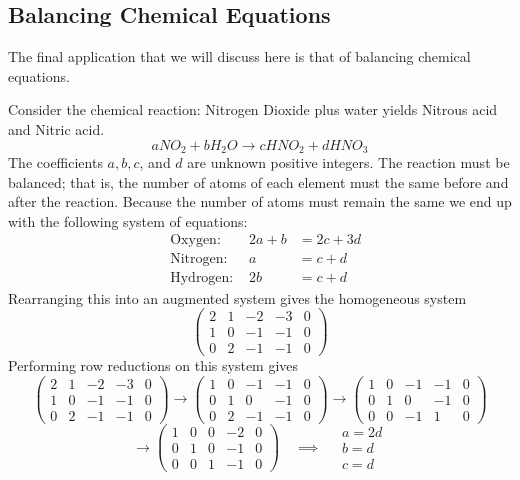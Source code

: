 \subsection{Balancing Chemical Equations}
The final application that we will discuss here is that of balancing chemical equations.  

Consider the chemical reaction: Nitrogen Dioxide plus water yields Nitrous acid and Nitric
acid.
\[ aNO_2 + b H_2O \to c HNO_2 + d HNO_3 \]
The coefficients $a,b,c$, and $d$ are unknown positive integers.  The reaction must be
balanced; that is, the number of atoms of each element must the same before and after the
reaction.  Because the number of atoms must remain the same we end up with the following
system of equations:
\begin{align*}
    &\text{Oxygen: } &  2a + b &= 2c + 3d \\
    &\text{Nitrogen: }  & a &= c + d \\
    &\text{Hydrogen: }  & 2b &= c + d
\end{align*}
Rearranging this into an augmented system gives the homogeneous system
\[ \left( \begin{array}{cccc|c} 2 & 1 & -2 & -3 & 0 \\
                                1 & 0 & -1 & -1 & 0 \\
                                0 & 2 & -1 & -1 & 0 \end{array} \right) \]
Performing row reductions on this system gives
\[ \left( \begin{array}{cccc|c} 2 & 1 & -2 & -3 & 0 \\
                                1 & 0 & -1 & -1 & 0 \\
                                0 & 2 & -1 & -1 & 0 \end{array} \right) 
    \to
   \left( \begin{array}{cccc|c} 1 & 0 & -1 & -1 & 0 \\
                          0 & 1 & 0 & -1 & 0 \\
                          0 & 2 & -1 & -1 & 0 \end{array} \right)
    \to
   \left( \begin{array}{cccc|c} 1 & 0 & -1 & -1 & 0 \\
                          0 & 1 & 0 & -1 & 0 \\
                          0 & 0 & -1 & 1 & 0 \end{array} \right)
                                \]
\[ \to 
   \left( \begin{array}{cccc|c} 1 & 0 & 0 & -2 & 0 \\
                          0 & 1 & 0 & -1 & 0 \\
                          0 & 0 & 1 & -1 & 0 \end{array} \right)
    \quad \implies \quad \begin{array}{l} a=2d \\ b=d \\ c=d \end{array}
                                \]
